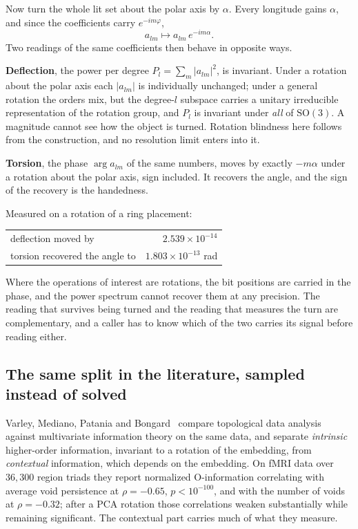 Now turn the whole lit set about the polar axis by \(\alpha\). Every longitude gains \(\alpha\), and since the coefficients carry \(e^{-im\varphi}\),
\[
  a_{lm} \longmapsto a_{lm} \, e^{-im\alpha}.
\]
Two readings of the same coefficients then behave in opposite ways.

\textbf{Deflection}, the power per degree \(P_l = \sum_m |a_{lm}|^2\), is invariant. Under a rotation about the polar axis each \(|a_{lm}|\) is individually unchanged; under a general rotation the orders mix, but the degree-\(l\) subspace carries a unitary irreducible representation of the rotation group, and \(P_l\) is invariant under \emph{all} of \(\mathrm{SO}(3)\). A magnitude cannot see how the object is turned. Rotation blindness here follows from the construction, and no resolution limit enters into it.

\textbf{Torsion}, the phase \(\arg a_{lm}\) of the same numbers, moves by exactly \(-m\alpha\) under a rotation about the polar axis, sign included. It recovers the angle, and the sign of the recovery is the handedness.

Measured on a rotation of a ring placement:

\begin{center}
\begin{tabular}{lr}
\toprule
deflection moved by & \(2.539 \times 10^{-14}\) \\
torsion recovered the angle to & \(1.803 \times 10^{-13}\) rad \\
\bottomrule
\end{tabular}
\end{center}

Where the operations of interest are rotations, the bit positions are carried in the phase, and the power spectrum cannot recover them at any precision. The reading that survives being turned and the reading that measures the turn are complementary, and a caller has to know which of the two carries its signal before reading either.

\subsection{The same split in the literature, sampled instead of solved}

Varley, Mediano, Patania and Bongard~\cite{src:Varley} compare topological data analysis against multivariate information theory on the same data, and separate \emph{intrinsic} higher-order information, invariant to a rotation of the embedding, from \emph{contextual} information, which depends on the embedding. On fMRI data over \(36{,}300\) region triads they report normalized O-information correlating with average void persistence at \(\rho = -0.65\), \(p < 10^{-100}\), and with the number of voids at \(\rho = -0.32\); after a PCA rotation those correlations weaken substantially while remaining significant. The contextual part carries much of what they measure.

